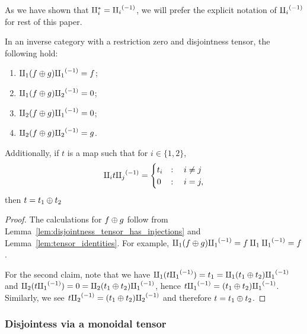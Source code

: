 As we have shown that $\amalg_{i}^{*} = {\amalg_{i}}^{(-1)}$, we will prefer the explicit notation of ${\amalg_{i}}^{(-1)}$ for
rest of this paper.

\begin{corollary}\label{cor:split_plus_tensor}
  In an inverse category \X with a restriction zero and disjointness tensor, the following hold:
  \begin{multicols}{2}
    \begin{enumerate}[{(}i{)}]
      \item $\amalg_{1} (f \oplus g) {\amalg_{1}}^{(-1)} = f$;
      \item $\amalg_{1} (f\oplus g) {\amalg_{2}}^{(-1)} = 0$;
      \item $\amalg_{2} (f \oplus g) {\amalg_{1}}^{(-1)} = 0$;
      \item $\amalg_{2} (f\oplus g) {\amalg_{2}}^{(-1)} = g$.
    \end{enumerate}
  \end{multicols}
  Additionally, if $t$ is a map such that for $i \in \{1,2\}$,
  \[
    \amalg_{i} t {\amalg_{j}}^{(-1)} =
    \begin{cases}
      t_i& : \quad i \neq j\\
      0 & : \quad i = j,
    \end{cases}
  \]
  then $t = t_1 \oplus t_2$
\end{corollary}
\begin{proof}
  The calculations for $f\oplus g$ follow from Lemma~\ref{lem:disjointness_tensor_has_injections} and
  Lemma~\ref{lem:tensor_identities}. For example, $\amalg_{1} (f\oplus g) {\amalg_{1}}^{(-1)} = f \amalg_{1} {\amalg_{1}}^{(-1)} = f$.

  For the second claim, note that we have $\amalg_{1} (t {\amalg_{1}}^{(-1)}) = t_1 = \amalg_{1} ( t_1 \oplus t_2){\amalg_{1}}^{(-1)}$ and
  $\amalg_{2}  (t {\amalg_{1}}^{(-1)}) = 0 = \amalg_{2} ( t_1 \oplus t_2){\amalg_{1}}^{(-1)}$, hence $t {\amalg_{1}}^{(-1)} = ( t_1 \oplus t_2){\amalg_{1}}^{(-1)}$. Similarly,
  we see $t{\amalg_{2}}^{(-1)} = ( t_1 \oplus t_2){\amalg_{2}}^{(-1)}$ and therefore $t = t_1 \oplus t_2$.
\end{proof}
\subsubsection{Disjointess via a monoidal tensor} %
\label{ssub:disjointess_via_a_monoidal_tensor}

